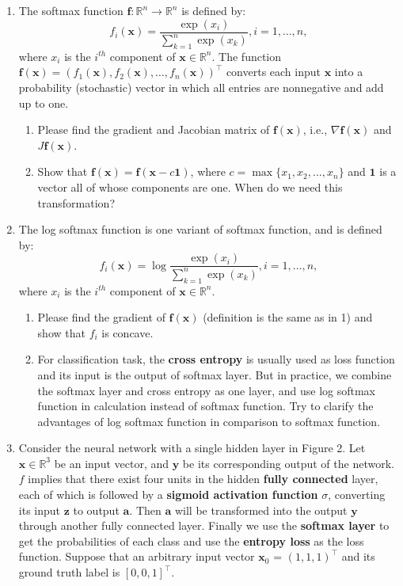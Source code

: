 \documentclass[11pt,letter,notitlepage]{article}
\begin{document}
\newpage
\begin{exercise}
\begin{enumerate}
    \item The softmax function $\textbf{f}:\mathbb{R}^n\rightarrow\mathbb{R}^n$ is defined by:
    $$f_i(\textbf{x})=\frac{\exp(x_i)}{\sum_{k=1}^{n}\exp(x_k)}, i=1,\ldots,n,$$
    where $x_i$ is the $i^{th}$ component of $\textbf{x}\in\mathbb{R}^n$. The function  $\textbf{f}(\textbf{x})=(f_1(\textbf{x}),f_2(\textbf{x}),\ldots,f_n(\textbf{x}))^{\top}$ converts each input $\textbf{x}$ into a probability (stochastic) vector in which all entries are nonnegative and add up to one.
    \begin{enumerate}
        \item Please find the gradient and Jacobian matrix of $\textbf{f}(\textbf{x})$, i.e., $\nabla \textbf{f}(\textbf{x})$ and $J\textbf{f}(\textbf{x})$.
        \item Show that $\textbf{f}(\mathbf{x})=\textbf{f}(\mathbf{x}-c\mathbf{1})$, where $c=\max\{x_1,x_2,...,x_n\}$ and $\mathbf{1}$ is a vector all of whose components are one. When do we need this transformation?
    \end{enumerate}
    \item The log softmax function is one variant of softmax function, and is defined by:
    $$f_i(\textbf{x})=\log\frac{\exp(x_i)}{\sum_{k=1}^{n}\exp(x_k)}, i=1,\ldots,n,$$
    where $x_i$ is the $i^{th}$ component of $\textbf{x}\in\mathbb{R}^n$. 
    \begin{enumerate}
        \item Please find the gradient of $\mathbf{f}(\mathbf{x})$ (definition is the same as in 1) and show that $f_i$ is concave.
        \item For classification task, the \textbf{cross entropy} is usually used as loss function and its input is the output of softmax layer. But in practice, we combine the softmax layer and cross entropy as one layer, and use log softmax function in calculation instead of softmax function. Try to clarify the advantages of log softmax function in comparison to softmax function.
    \end{enumerate}
    \item Consider the neural network with a single hidden layer in Figure 2. Let $\mathbf{x}\in\mathbb{R}^3$ be an input vector, and $\mathbf{y}$ be its corresponding output of the network. $f$ implies that there exist four units in the hidden \textbf{fully connected} layer, each of which is followed by a \textbf{sigmoid activation function} $\sigma$, converting its input $\mathbf{z}$ to output $\mathbf{a}$. Then $\mathbf{a}$ will be transformed into the output $\mathbf{y}$ through another fully connected layer. Finally we use the \textbf{softmax layer} to get the probabilities of each class and use the \textbf{entropy loss} as the loss function. Suppose that an arbitrary input vector $\mathbf{x}_0$ = $(1, 1, 1)^\top$ and its ground truth label is $[0,0,1]^\top$.

\end{enumerate}
\end{exercise}
\end{document}
